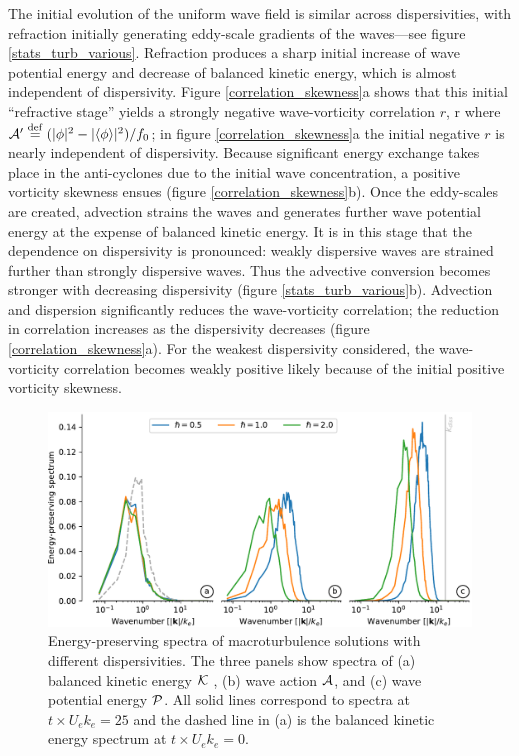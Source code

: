 \documentclass{jfm}
\begin{document}
The initial evolution of the uniform wave field is similar across dispersivities,
with refraction initially  generating eddy-scale gradients of the waves---see figure \ref{stats_turb_various}.
Refraction produces a sharp initial increase of wave potential energy and decrease
of balanced kinetic energy, which is almost independent of dispersivity. Figure \ref{correlation_skewness}a
shows  that this initial
``refractive stage'' yields a strongly negative wave-vorticity correlation $r$,
\beq
r  {}\com
\label{rdefn}
\eeq
where $\A'\defn (|\phi|^2-|\la\phi\ra|^2)/f_0$; in figure \ref{correlation_skewness}a the initial negative $r$
is nearly independent of dispersivity. Because significant energy exchange
takes place in the anti-cyclones due to the initial wave concentration, a positive
vorticity skewness ensues (figure \ref{correlation_skewness}b). Once the
eddy-scales are created, advection strains the waves and  generates further  wave
potential energy at the expense of balanced kinetic energy. It is in this stage
that the dependence on dispersivity is pronounced: weakly dispersive waves are
strained further than strongly dispersive waves. Thus the advective conversion becomes
stronger with decreasing dispersivity (figure \ref{stats_turb_various}b). Advection
and dispersion significantly reduces the wave-vorticity correlation; the reduction
in correlation increases as the dispersivity decreases (figure \ref{correlation_skewness}a). For the weakest dispersivity
considered, the wave-vorticity correlation becomes weakly positive likely because of
the initial positive vorticity skewness.

\begin{figure}
\centering
\includegraphics[width=1.\textwidth]{figs/FigSpectraVarious.pdf}
\caption{Energy-preserving spectra of macroturbulence solutions with different
         dispersivities. The three panels show spectra of (a)  balanced kinetic energy
          $\K$ , (b) wave action $\A$, and (c) wave potential
          energy $\P$. All solid lines correspond to spectra at
          $t\times U_e k_e = 25$ and the dashed line in (a)  is
          the balanced kinetic energy spectrum at $t\times U_ek_e = 0$.
        } \label{spectra_turb_various}
\end{figure}
\end{document}
